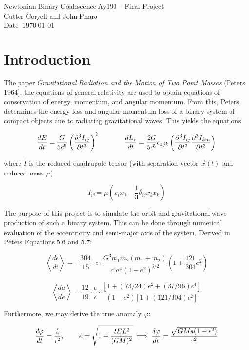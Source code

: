 \documentclass[11pt,letterpaper]{article}
\begin{document}
\begin{center}
\Large
Newtonian Binary Coalescence
Ay190 -- Final Project\\
Cutter Coryell and John Pharo\\
Date: \today
\end{center}

\section{Introduction}

The paper \textit{Gravitational Radiation and the Motion of Two Point Masses} (Peters 1964), the equations of general relativity are used to obtain equations of conservation of energy, momentum, and angular momentum. From this, Peters determines the energy loss and angular momentum loss of a binary system of compact objects due to radiating gravitational waves. This yields the equations

$$ \frac{dE}{dt} = \frac{G}{5c^5} \left( \frac{\partial^3 \bar{I}_{ij}}{\partial t^3} \right)^2 \hspace*{.5in} \frac{dL_z}{dt} = \frac{2G}{5c^5} \epsilon_{zjk} \left( \frac{\partial^3 \bar{I}_{ij}}{\partial t^3} \frac{\partial^3 \bar{I}_{km}}{\partial t^3} \right) $$

where $\bar{I}$ is the reduced quadrupole tensor (with separation vector $\vec{x} (t)$ and reduced mass $\mu$):

$$ \bar{I}_{ij}  =\mu (x_i x_j - \frac{1}{3} \delta_{ij} x_k x_k) $$

The purpose of this project is to simulate the orbit and gravitational wave production of such a binary system. This can be done through numerical evaluation of the eccentricity and semi-major axis of the system. Derived in Peters Equations 5.6 and 5.7:

$$ \left< \frac{de}{dt} \right> = - \frac{304}{15} \cdot e \cdot \frac{G^3 m_1 m_2 (m_1 + m_2)}{c^5 a^4 (1 - e^2)^{5/2}} \left( 1 + \frac{121}{304}e^2 \right) $$

$$ \left< \frac{da}{de} \right> = \frac{12}{19} \cdot \frac{a}{e} \cdot \frac{[1 + (73/24)e^2 + (37/96)e^4]}{(1 - e^2)[1 + (121/304)e^2]} $$

Furthermore, we may derive the true anomaly $\varphi$:

$$ \frac{d \varphi}{dt} = \frac{L}{r^2}, \hspace*{.3in} e = \sqrt{1 + \frac{2EL^2}{(GM)^2}} \implies \frac{d \varphi}{dt} = \frac{\sqrt{GMa(1 - e^2)}}{r^2} $$
\end{document}
